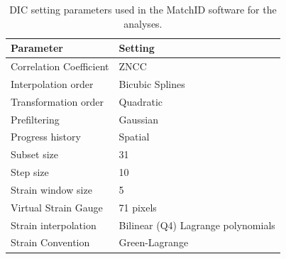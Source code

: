 \documentclass[3p,times,procedia]{elsarticle}
\begin{document}
\begin{table}[h]
	\centering
	\begin{tabular}{|m{}|m{}|}
		\hline
		\textbf{Parameter} & \textbf{Setting} \\
		\hline
		Correlation Coefficient & ZNCC \\
		\hline
		Interpolation order & Bicubic Splines \\ 
		\hline
		Transformation order & Quadratic \\
		\hline
		Prefiltering & Gaussian \\
		\hline
		Progress history & Spatial \\
		\hline
		Subset size & 31 \\
		\hline
		Step size & 10 \\
		\hline
		Strain window size & 5 \\ 
		\hline
		Virtual Strain Gauge & 71 pixels \\
		\hline
		Strain interpolation & Bilinear (Q4) Lagrange polynomials \\
		\hline
		Strain Convention & Green-Lagrange \\
		\hline
	\end{tabular}
	\caption{DIC setting parameters used in the MatchID software for the analyses.}
	\label{tab:MatchID_param}
\end{table}

\end{document}
